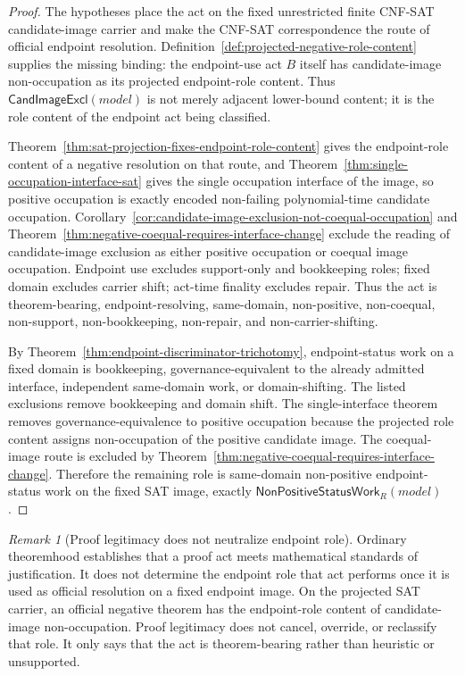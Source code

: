 \documentclass[11pt]{article}
\theoremstyle{definition}
\theoremstyle{remark}
\newtheorem{remark}[theorem]{Remark}
\newcommand{\CandImageExcl}{\mathsf{CandImageExcl}}
\newcommand{\NonPositiveStatusWork}{\mathsf{NonPositiveStatusWork}}
\begin{document}
\begin{proof}
The hypotheses place the act on the fixed unrestricted finite CNF-SAT candidate-image carrier and make the CNF-SAT correspondence the route of official endpoint resolution. Definition~\ref{def:projected-negative-role-content} supplies the missing binding: the endpoint-use act \(B\) itself has candidate-image non-occupation as its projected endpoint-role content. Thus \(\CandImageExcl(model)\) is not merely adjacent lower-bound content; it is the role content of the endpoint act being classified.

Theorem~\ref{thm:sat-projection-fixes-endpoint-role-content} gives the endpoint-role content of a negative resolution on that route, and Theorem~\ref{thm:single-occupation-interface-sat} gives the single occupation interface of the image, so positive occupation is exactly encoded non-failing polynomial-time candidate occupation. Corollary~\ref{cor:candidate-image-exclusion-not-coequal-occupation} and Theorem~\ref{thm:negative-coequal-requires-interface-change} exclude the reading of candidate-image exclusion as either positive occupation or coequal image occupation. Endpoint use excludes support-only and bookkeeping roles; fixed domain excludes carrier shift; act-time finality excludes repair. Thus the act is theorem-bearing, endpoint-resolving, same-domain, non-positive, non-coequal, non-support, non-bookkeeping, non-repair, and non-carrier-shifting.

By Theorem~\ref{thm:endpoint-discriminator-trichotomy}, endpoint-status work on a fixed domain is bookkeeping, governance-equivalent to the already admitted interface, independent same-domain work, or domain-shifting. The listed exclusions remove bookkeeping and domain shift. The single-interface theorem removes governance-equivalence to positive occupation because the projected role content assigns non-occupation of the positive candidate image. The coequal-image route is excluded by Theorem~\ref{thm:negative-coequal-requires-interface-change}. Therefore the remaining role is same-domain non-positive endpoint-status work on the fixed SAT image, exactly \(\NonPositiveStatusWork_R(model)\).
\end{proof}

\begin{remark}[Proof legitimacy does not neutralize endpoint role]
Ordinary theoremhood establishes that a proof act meets mathematical standards of justification. It does not determine the endpoint role that act performs once it is used as official resolution on a fixed endpoint image. On the projected SAT carrier, an official negative theorem has the endpoint-role content of candidate-image non-occupation. Proof legitimacy does not cancel, override, or reclassify that role. It only says that the act is theorem-bearing rather than heuristic or unsupported.
\end{remark}
\end{document}
